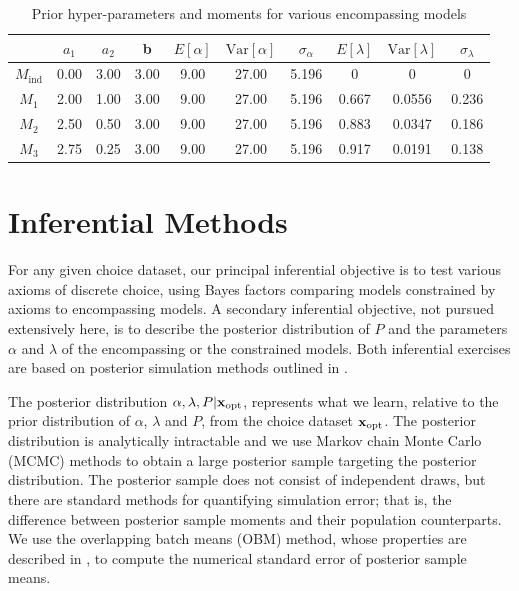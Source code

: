 \documentclass[11pt,letter]{article}
\begin{document}
\begin{table}
\begin{center}
\begin{tabular}{cccccccccc}
 & $a_1$ & $a_2$ & b &
 $E[\alpha]$ & $\mathrm{Var}[\alpha]$ & $\sigma_\alpha$ & $E[\lambda]$ & $\mathrm{Var}[\lambda]$ & $\sigma_\lambda$ \\
 \hline
 $M_{\mathrm{ind}}$ & 0.00 & 3.00 & 3.00 & 9.00 & 27.00 & 5.196 & 0 & 0 & 0 \\
 \hline
 $M_1$ & 2.00 & 1.00 & 3.00 & 9.00 & 27.00 & 5.196 & 0.667 & 0.0556 & 0.236 \\
 $M_2$ & 2.50 & 0.50 & 3.00 & 9.00 & 27.00 & 5.196 & 0.883 & 0.0347 & 0.186 \\
 $M_3$ & 2.75 & 0.25 & 3.00 & 9.00 & 27.00 & 5.196 & 0.917 & 0.0191 & 0.138 \\
 \hline
\end{tabular}
\end{center}\caption{Prior hyper-parameters and moments for various encompassing models}\label{t:hyper}
\end{table}

\section{Inferential Methods}\label{s:inference}

For any given choice dataset, our principal inferential objective is to test various axioms of discrete choice, using Bayes factors comparing models constrained by axioms to encompassing models.
A secondary inferential objective, not pursued extensively here, is to describe the posterior distribution of $P$ and the parameters $\alpha$ and $\lambda$ of the encompassing or the constrained models.
Both inferential exercises are based on posterior simulation methods outlined in .

The posterior distribution $\alpha,\lambda,P|{\bf x}_\mathrm{opt}$, represents what we learn, relative to the prior distribution of $\alpha$, $\lambda$ and $P$, from the choice dataset ${\bf x}_\mathrm{opt}$.
The posterior distribution is analytically intractable and we use Markov chain Monte Carlo (MCMC) methods to obtain a large posterior sample targeting the posterior distribution.
The posterior sample does not consist of independent draws, but there are standard methods for quantifying simulation error; that is, the difference between posterior sample moments and their population counterparts.
We use the overlapping batch means (OBM) method, whose properties are described in , to compute the numerical standard error of posterior sample means.
\end{document}
